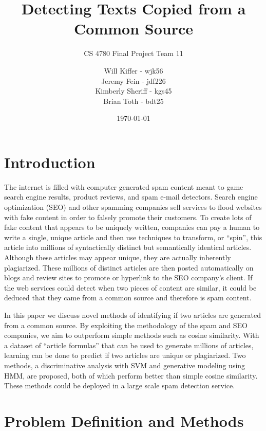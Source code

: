 \documentclass[11pt,letterpaper,oneside, titlepage]{scrartcl}
\begin{document}
\title{Detecting Texts Copied from a Common Source}
\subtitle{CS 4780 Final Project Team 11}
\date{\today}
\author{Will Kiffer - wjk56\\Jeremy Fein - jdf226\\Kimberly Sheriff - kgs45\\Brian Toth - bdt25}
\maketitle


\tableofcontents
\clearpage

\section{Introduction}

The internet is filled with computer generated spam content meant to game search engine results, product reviews, and spam e-mail detectors. Search engine optimization (SEO) and other spamming companies sell services to flood websites with fake content in order to falsely promote their customers. To create lots of fake content that appears to be uniquely written, companies can pay a human to write a single, unique article and then use techniques to transform, or “spin”, this article into millions of syntactically distinct but semantically identical articles. Although these articles may appear unique, they are actually inherently plagiarized. These millions of distinct articles are then posted automatically on blogs and review sites to promote or hyperlink to the SEO company’s client. If the web services could detect when two pieces of content are similar, it could be deduced that they came from a common source and therefore is spam content.

In this paper we discuss novel methods of identifying if two articles are generated from a common source. By exploiting the methodology of the spam and SEO companies, we aim to outperform simple methods such as cosine similarity. With a dataset of “article formulas” that can be used to generate millions of articles, learning can be done to predict if two articles are unique or plagiarized. Two methods, a discriminative analysis with SVM and generative modeling using HMM, are proposed, both of which perform better than simple cosine similarity. These methods could be deployed in a large scale spam detection service.

\section{Problem Definition and Methods}
\end{document}
